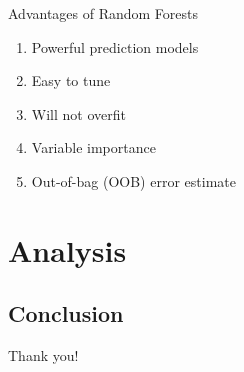 \documentclass[pdf]{beamer}
\begin{document}
		\begin{frame}{Advantages of Random Forests}
			\begin{enumerate}
				\item{Powerful prediction models}
				\item{Easy to tune}
				\item{Will not overfit}
				\item{Variable importance}
				\item{Out-of-bag (OOB) error estimate}
			\end{enumerate}
		\end{frame}




\section{Analysis}
	
		
	\subsection{Conclusion}	
		
		\begin{frame}{\hspace{3 mm}}
			\begin{center}
			Thank you!
			\end{center}
		\end{frame} 
		
		
		
\end{document}
